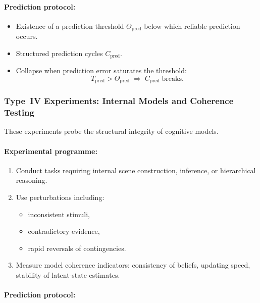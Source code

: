 \paragraph{Prediction protocol:}

\begin{itemize}
    \item Existence of a prediction threshold 
          $\Theta_{\mathrm{pred}}$ below which reliable prediction occurs.
    \item Structured prediction cycles $C_{\mathrm{pred}}$.
    \item Collapse when prediction error saturates the threshold:
          \[
             T_{\mathrm{pred}} > \Theta_{\mathrm{pred}}
             \;\Rightarrow\; C_{\mathrm{pred}} \;\text{breaks}.
          \]
\end{itemize}



\subsubsection{Type~IV Experiments: Internal Models and Coherence Testing}

These experiments probe the structural integrity of
cognitive models.

\paragraph{Experimental programme:}

\begin{enumerate}
    \item Conduct tasks requiring internal scene construction,
          inference, or hierarchical reasoning.
    \item Use perturbations including:
          \begin{itemize}
              \item inconsistent stimuli,
              \item contradictory evidence,
              \item rapid reversals of contingencies.
          \end{itemize}
    \item Measure model coherence indicators:
          consistency of beliefs, updating speed, stability of
          latent-state estimates.
\end{enumerate}

\paragraph{Prediction protocol:}

